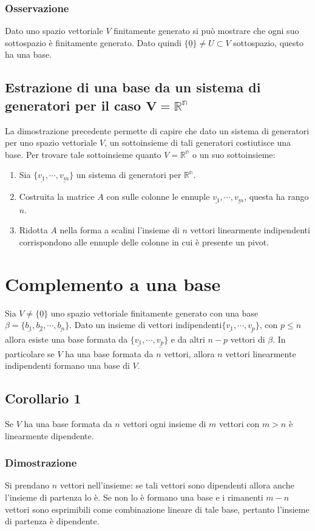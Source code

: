 \subsubsection{Osservazione}
Dato uno spazio vettoriale $V$ finitamente generato si pu\`o mostrare che ogni suo sottospazio \`e finitamente generato. Dato quindi $\{\underline{0}
\}\neq U\subset V$ sottospazio, questo ha una base.
\subsection{Estrazione di una base da un sistema di generatori per il caso $\mathbf{V=\mathbb{R^n}}$}
La dimostrazione precedente permette di capire che dato un sistema di generatori per uno spazio vettoriale $V$, un sottoinsieme di tali generatori costiutisce una base. 
Per trovare tale sottoinsieme quanto $V=\mathbb{R^n}$ o un suo sottoinsieme:
\begin{enumerate}
\item Sia $\{\underline{v_1},\cdots,\underline{v_m}\}$ un sistema di generatori per $\mathbb{R^n}$.
\item Costruita la matrice $A$ con sulle colonne le ennuple $\underline{v_1},\cdots,\underline{v_m}$, questa ha rango $n$.
\item Ridotta $A$ nella forma a scalini l'insieme di $n$ vettori linearmente indipendenti corrispondono alle ennuple delle colonne in cui \`e presente un pivot.
\end{enumerate}
\section{Complemento a una base}
Sia $V\neq \{\underline{0}\}$ uno spazio vettoriale finitamente generato con una base $\beta=\{\underline{b_1},\underline{b_2},\cdots, \underline{b_n}\}$. Dato un insieme di 
vettori indipendenti$\{\underline{v_1},\cdots,\underline{v_p}\}$, con $p\le n$ allora esiste una base formata da $\{\underline{v_1},\cdots,\underline{v_p}\}$ e da altri $n-p
$ vettori di $\beta$. In particolare se $V$ ha una base formata da $n$ vettori, allora $n$ vettori linearmente indipendenti formano una base di $V$.
\subsection{Corollario 1}
Se $V$ ha una base formata da $n$ vettori ogni insieme di $m$ vettori con $m>n$ \`e linearmente dipendente.
\subsubsection{Dimostrazione}
Si prendano $n$ vettori nell'insieme: se tali vettori sono dipendenti allora anche l'insieme di partenza lo \`e. Se non lo \`e formano una base e i rimanenti $m-n$ vettori
sono esprimibili come combinazione lineare di tale base, pertanto l'insieme di partenza \`e dipendente.
